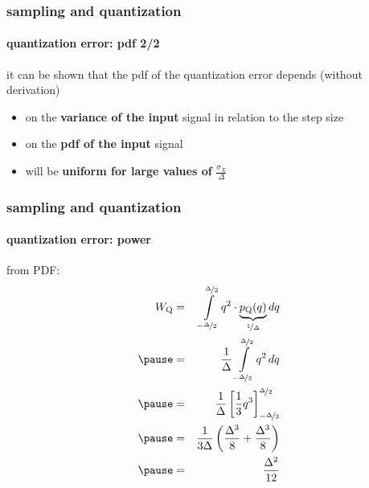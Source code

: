 	\begin{frame}\frametitle{sampling and quantization}\framesubtitle{quantization error: pdf 2/2}
        \vspace{-3mm}
        it can be shown that the pdf of the quantization error depends (without derivation)
        \begin{itemize}
            \item on the \textbf{variance of the input} signal in relation to the step size
            \item   on the \textbf{pdf of the input} signal
            \smallskip
            \item<2->[$\rightarrow$]   will be \textbf{uniform for large values of} $\frac{\sigma_X}{\Delta}$
        \end{itemize}
	\end{frame}
	\begin{frame}\frametitle{sampling and quantization}\framesubtitle{quantization error: power}
        
        \begin{footnotesize}
        from PDF:
        \begin{eqnarray*}
            W_\mathrm{Q} &=& \int\limits_{-\nicefrac{\Delta}{2}}^{\nicefrac{\Delta}{2}}{q^2\cdot \underbrace{p_\mathrm{Q}(q)}_{\nicefrac{1}{\Delta}}}\, dq\\
            \pause
            &=& \frac{1}{\Delta}\int\limits_{-\nicefrac{\Delta}{2}}^{\nicefrac{\Delta}{2}} q^2\, dq\\
            \pause
            &=& \frac{1}{\Delta} \left[\frac{1}{3}q^3\right]_{-\nicefrac{\Delta}{2}}^{\nicefrac{\Delta}{2}}\\
            \pause
            &=& \frac{1}{3\Delta}\left(\frac{\Delta^3}{8} + \frac{\Delta^3}{8}\right)\\
            \pause
            &=& \frac{\Delta^2}{12}
        \end{eqnarray*}
        \end{footnotesize}
        
	\end{frame}
